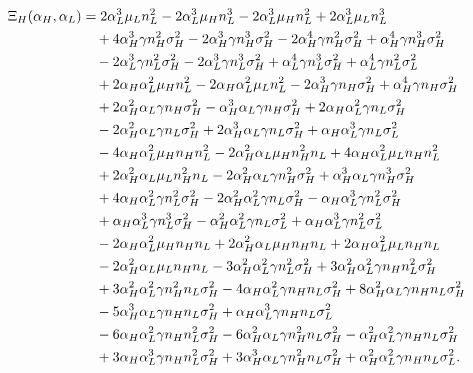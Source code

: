 \documentclass[a4paper,12pt]{article}
\theoremstyle{definition}
\theoremstyle{remark}
\newcommand{\1}{\mathbf{1}}
\begin{document}
\begin{align}
    \Xi_H(\alpha_H,\alpha_L)
    &= 2 \alpha_L^3 \mu_L n_L^2 - 2 \alpha_L^3 \mu_H n_L^3 - 2 \alpha_L^3 \mu_H n_L^2 + 2 \alpha_L^3 \mu_L n_L^3 \notag\\
    &\quad + 4 \alpha_H^3 \gamma n_H^2 \sigma_H^2 - 2 \alpha_H^3 \gamma n_H^3 \sigma_H^2 - 2 \alpha_H^4 \gamma n_H^2 \sigma_H^2 + \alpha_H^4 \gamma n_H^3 \sigma_H^2 \notag\\
    &\quad - 2 \alpha_L^3 \gamma n_L^2 \sigma_H^2 - 2 \alpha_L^3 \gamma n_L^3 \sigma_H^2 + \alpha_L^4 \gamma n_L^3 \sigma_H^2 + \alpha_L^4 \gamma n_L^2 \sigma_L^2 \notag\\
    &\quad + 2 \alpha_H \alpha_L^2 \mu_H n_L^2 - 2 \alpha_H \alpha_L^2 \mu_L n_L^2 - 2 \alpha_H^3 \gamma n_H \sigma_H^2 + \alpha_H^4 \gamma n_H \sigma_H^2 \notag\\
    &\quad + 2 \alpha_H^2 \alpha_L \gamma n_H \sigma_H^2 - \alpha_H^3 \alpha_L \gamma n_H \sigma_H^2 + 2 \alpha_H \alpha_L^2 \gamma n_L \sigma_H^2 \notag\\
    &\quad - 2 \alpha_H^2 \alpha_L \gamma n_L \sigma_H^2 + 2 \alpha_H^3 \alpha_L \gamma n_L \sigma_H^2 + \alpha_H \alpha_L^3 \gamma n_L \sigma_L^2 \notag\\
    &\quad - 4 \alpha_H \alpha_L^2 \mu_H n_H n_L^2 - 2 \alpha_H^2 \alpha_L \mu_H n_H^2 n_L + 4 \alpha_H \alpha_L^2 \mu_L n_H n_L^2 \notag\\
    &\quad + 2 \alpha_H^2 \alpha_L \mu_L n_H^2 n_L - 2 \alpha_H^2 \alpha_L \gamma n_H^2 \sigma_H^2 + \alpha_H^3 \alpha_L \gamma n_H^3 \sigma_H^2 \notag\\
    &\quad + 4 \alpha_H \alpha_L^2 \gamma n_L^2 \sigma_H^2 - 2 \alpha_H^2 \alpha_L^2 \gamma n_L \sigma_H^2 - \alpha_H \alpha_L^3 \gamma n_L^2 \sigma_H^2 \notag\\
    &\quad + \alpha_H \alpha_L^3 \gamma n_L^3 \sigma_H^2 - \alpha_H^2 \alpha_L^2 \gamma n_L \sigma_L^2 + \alpha_H \alpha_L^3 \gamma n_L^2 \sigma_L^2 \notag\\
    &\quad - 2 \alpha_H \alpha_L^2 \mu_H n_H n_L + 2 \alpha_H^2 \alpha_L \mu_H n_H n_L + 2 \alpha_H \alpha_L^2 \mu_L n_H n_L \notag\\
    &\quad - 2 \alpha_H^2 \alpha_L \mu_L n_H n_L - 3 \alpha_H^2 \alpha_L^2 \gamma n_L^2 \sigma_H^2 + 3 \alpha_H^2 \alpha_L^2 \gamma n_H n_L^2 \sigma_H^2 \notag\\
    &\quad + 3 \alpha_H^2 \alpha_L^2 \gamma n_H^2 n_L \sigma_H^2 - 4 \alpha_H \alpha_L^2 \gamma n_H n_L \sigma_H^2 + 8 \alpha_H^2 \alpha_L \gamma n_H n_L \sigma_H^2 \notag\\
    &\quad - 5 \alpha_H^3 \alpha_L \gamma n_H n_L \sigma_H^2 + \alpha_H \alpha_L^3 \gamma n_H n_L \sigma_L^2 \notag\\
    &\quad - 6 \alpha_H \alpha_L^2 \gamma n_H n_L^2 \sigma_H^2 - 6 \alpha_H^2 \alpha_L \gamma n_H^2 n_L \sigma_H^2 - \alpha_H^2 \alpha_L^2 \gamma n_H n_L \sigma_H^2 \notag\\
    &\quad + 3 \alpha_H \alpha_L^3 \gamma n_H n_L^2 \sigma_H^2 + 3 \alpha_H^3 \alpha_L \gamma n_H^2 n_L \sigma_H^2 + \alpha_H^2 \alpha_L^2 \gamma n_H n_L \sigma_L^2. \label{eq:XiH}
\end{align}
\end{document}
